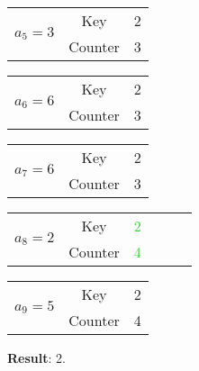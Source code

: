 \documentclass{article}
\newcommand{\MGinc}[1]{\textcolor{LimeGreen}{#1}}
\begin{document}
\begin{center}
\begin{minipage}{0.45\textwidth}
\begin{center}
      \end{center}
    \end{minipage}
    \begin{minipage}{0.45\textwidth}
      \begin{center}
        \begin{tabular}{c|c|c|}
          \cline{2-3}
          \multirow{2}{*}{\textbf{\LARGE{$a_5=3$}}}
          & Key & 2 \\\cline{2-3}
          & Counter & 3 \\
          \cline{2-3}
        \end{tabular}\vspace{3mm}

        \begin{tabular}{c|c|c|}
          \cline{2-3}
          \multirow{2}{*}{\textbf{\LARGE{$a_6=6$}}}
          & Key & 2 \\\cline{2-3}
          & Counter & 3 \\
          \cline{2-3}
        \end{tabular}\vspace{3mm}

        \begin{tabular}{c|c|c|}
          \cline{2-3}
          \multirow{2}{*}{\textbf{\LARGE{$a_7=6$}}}
          & Key & 2 \\\cline{2-3}
          & Counter & 3 \\
          \cline{2-3}
        \end{tabular}\vspace{3mm}

        \begin{tabular}{c|c|c|c|c|c|}
          \cline{2-3}
          \multirow{2}{*}{\textbf{\LARGE{$a_8=2$}}}
          & Key & \MGinc{2} \\\cline{2-3}
          & Counter & \MGinc{4} \\
          \cline{2-3}
        \end{tabular}\vspace{3mm}

        \begin{tabular}{c|c|c|}
          \cline{2-3}
          \multirow{2}{*}{\textbf{\LARGE{$a_9=5$}}}
          & Key & 2 \\\cline{2-3}
          & Counter & 4 \\
          \cline{2-3}
        \end{tabular}
      \end{center}
    \end{minipage}
  \end{center}\vspace{3mm}
  \textbf{Result}: 2.
\end{document}
